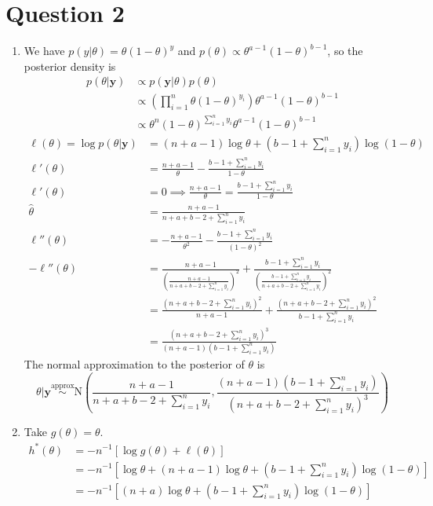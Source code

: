\documentclass[a4paper,12pt]{article}\usepackage[]{graphicx}\usepackage[]{color}
\newcommand{\by}{\mathbf{y}}
\newcommand{\N}{\mathrm{N}}
\begin{document}
\section*{Question 2}
\begin{enumerate}[label=(\alph*)]
\item We have $p(y|\theta)=\theta(1-\theta)^y$ and $p(\theta)\propto \theta^{a-1}(1-\theta)^{b-1}$, so the posterior density is
\begin{align*}
p(\theta|\by) &\propto p(\by|\theta)p(\theta) \\
&\propto \left(\prod_{i=1}^n\theta(1-\theta)^{y_i}\right)\theta^{a-1}(1-\theta)^{b-1} \\
&\propto \theta^n(1-\theta)^{\sum_{i=1}^ny_i}\theta^{a-1}(1-\theta)^{b-1}
\end{align*}
\begin{align*}
\ell(\theta)=\log p(\theta|\by)&=(n+a-1)\log\theta+\left(b-1+\sum_{i=1}^ny_i\right)\log(1-\theta) \\
\ell'(\theta)&=\frac{n+a-1}{\theta}-\frac{b-1+\sum_{i=1}^ny_i}{1-\theta} \\
\ell'(\theta)&=0\implies \frac{n+a-1}{\theta}=\frac{b-1+\sum_{i=1}^ny_i}{1-\theta} \\
\hat\theta&=\frac{n+a-1}{n+a+b-2+\sum_{i=1}^ny_i} \\
\ell''(\theta)&=-\frac{n+a-1}{\theta^2}-\frac{b-1+\sum_{i=1}^ny_i}{(1-\theta)^2} \\
-\ell''(\theta)&=\frac{n+a-1}{\left(\frac{n+a-1}{n+a+b-2+\sum_{i=1}^ny_i}\right)^2}+\frac{b-1+\sum_{i=1}^ny_i}{\left(\frac{b-1+\sum_{i=1}^ny_i}{n+a+b-2+\sum_{i=1}^ny_i}\right)^2} \\
&= \frac{\left(n+a+b-2+\sum_{i=1}^ny_i\right)^2}{n+a-1}+\frac{\left(n+a+b-2+\sum_{i=1}^ny_i\right)^2}{b-1+\sum_{i=1}^ny_i} \\
&= \frac{\left(n+a+b-2+\sum_{i=1}^ny_i\right)^3}{(n+a-1)(b-1+\sum_{i=1}^ny_i)}
\end{align*}
The normal approximation to the posterior of $\theta$ is
$$\theta|\by\stackrel{\textrm{approx}}{\sim} \N\left(\frac{n+a-1}{n+a+b-2+\sum_{i=1}^ny_i},\frac{(n+a-1)(b-1+\sum_{i=1}^ny_i)}{\left(n+a+b-2+\sum_{i=1}^ny_i\right)^3}\right)$$
\item Take $g(\theta)=\theta$.
\begin{align*}
h^*(\theta)&=-n^{-1}[\log g(\theta)+\ell(\theta)] \\
&= -n^{-1}\left[\log\theta+(n+a-1)\log\theta+\left(b-1+\sum_{i=1}^ny_i\right)\log(1-\theta)\right] \\
&= -n^{-1}\left[(n+a)\log\theta+\left(b-1+\sum_{i=1}^ny_i\right)\log(1-\theta)\right]

\end{align*}
\end{enumerate}
\end{document}
